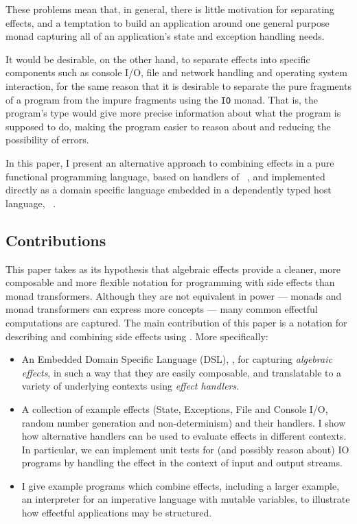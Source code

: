 \noindent
These problems mean that, in general, there is little motivation for separating
effects, and a temptation to build an application around one general purpose
monad capturing all of an application's state and exception handling needs.

It would be desirable, on the other hand, to separate effects into specific
components such as console I/O, file and network handling and operating system
interaction, for the same reason that it is desirable to separate the pure
fragments of a program from the impure fragments using the \texttt{IO} monad.
That is, the program's type would give more precise information about what the
program is supposed to do, making the program easier to reason about and
reducing the possibility of errors.

In this paper, I present an alternative approach to combining effects in
a pure functional programming language, based on handlers of
~\cite{Bauer}, and
implemented directly as a domain specific language embedded
in a dependently typed host language, \Idris{}~\cite{Brady2013,idristutorial}.

\subsection{Contributions}

This paper takes as its hypothesis that algebraic effects provide a cleaner,
more composable and more flexible notation for programming with side effects
than monad transformers. Although they are not equivalent in power --- monads
and monad transformers can express more concepts --- many common effectful
computations are captured. 
The main contribution of this paper is a notation for describing and combining
side effects using \Idris{}. More specifically:


\begin{itemize}
\item An Embedded Domain Specific Language (DSL), \Eff{}, for capturing \emph{algebraic
effects}, in such a way that they are easily composable, and translatable to a
variety of underlying contexts using \emph{effect handlers}.
\item A collection of example effects (State, Exceptions,
File and Console I/O, random number generation and
non-determinism) and their handlers. I show how alternative handlers
can be used to evaluate effects in different contexts. In particular, we can
implement unit tests for (and possibly reason about) IO programs by handling
the effect in the context of input and output streams.
\item I give example programs which combine effects, including a larger
example, an interpreter for an imperative language with mutable variables, to
illustrate how effectful applications may be structured.
\end{itemize}

